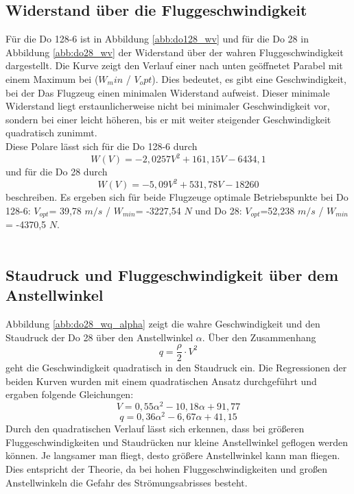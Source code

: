\subsection{Widerstand über die Fluggeschwindigkeit}
Für die Do 128-6 ist in Abbildung \ref{abb:do128_wv} und für die Do 28 in Abbildung \ref{abb:do28_wv} der Widerstand über der wahren Fluggeschwindigkeit dargestellt. Die Kurve zeigt den Verlauf einer nach unten geöffnetet Parabel mit einem Maximum bei ($W_min$ / $V_opt$). Dies bedeutet, es gibt eine Geschwindigkeit, bei der Das Flugzeug einen minimalen Widerstand aufweist. Dieser minimale Widerstand liegt erstaunlicherweise nicht bei minimaler Geschwindigkeit vor, sondern bei einer leicht höheren, bis er mit weiter steigender Geschwindigkeit quadratisch zunimmt. \\
Diese Polare lässt sich für die Do 128-6 durch 
\begin{equation}
W(V)=-2,0257V^2+161,15V-6434,1
\end{equation}
und für die Do 28 durch 
\begin{equation}
W(V)=-5,09V^2+531,78V-18260
\end{equation}
 beschreiben. Es ergeben sich für beide Flugzeuge optimale Betriebspunkte bei Do 128-6: $V_{opt}$= 39,78 $m/s$ / 
$W_{min}$= -3227,54 $N$ und Do 28: $V_{opt}$=52,238 $m/s$ / 
$W_{min}$= -4370,5 $N$.
\\\\
\subsection{Staudruck und Fluggeschwindigkeit über dem Anstellwinkel}
Abbildung \ref{abb:do28_wq_alpha} zeigt die wahre Geschwindigkeit und den Staudruck der Do 28 über den Anstellwinkel $\alpha$. Über den Zusammenhang 
\begin{equation}
q = \frac{\rho}{2} \cdot V^2
\end{equation}
geht die Geschwindigkeit quadratisch in den Staudruck ein.
Die Regressionen der beiden Kurven wurden mit einem quadratischen Ansatz durchgeführt und ergaben folgende Gleichungen:
\begin{equation}
V = 0,55\alpha^2 - 10,18\alpha +91,77
\end{equation}
\begin{equation}
q = 0,36\alpha^2 -6,67\alpha +41,15
\end{equation}
Durch den quadratischen Verlauf lässt sich erkennen, dass bei größeren Fluggeschwindigkeiten und Staudrücken nur kleine Anstellwinkel geflogen werden können. Je langsamer man fliegt, desto größere Anstellwinkel kann man fliegen. Dies entspricht der Theorie, da bei hohen Fluggeschwindigkeiten und großen Anstellwinkeln die Gefahr des Strömungsabrisses besteht.
\newpage

